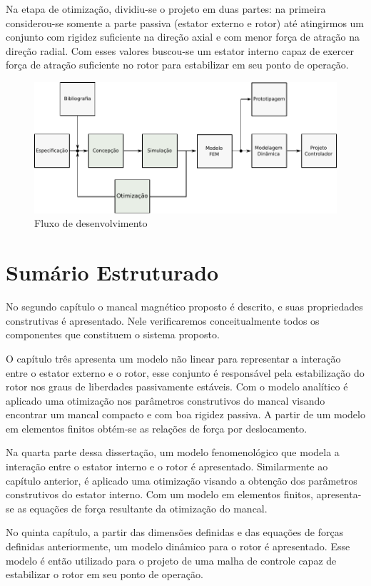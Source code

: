 Na etapa de otimização, dividiu-se o projeto em duas partes: na primeira considerou-se somente a parte passiva (estator externo e rotor) até atingirmos um conjunto com rigidez suficiente na direção axial e com menor força de atração na direção radial. Com esses valores buscou-se um estator interno capaz de exercer força de atração suficiente no rotor para estabilizar em seu ponto de operação.
 
\begin{figure}[th!]
	\centering
	\includegraphics[width=1\linewidth]{Figs/metodologia_fluxo_dev}
	\caption{Fluxo de desenvolvimento}
	\label{fig:metodologia:fluxo:dev}
\end{figure}
 
\section{Sumário Estruturado}
 
No segundo capítulo o mancal magnético proposto é descrito, e suas propriedades construtivas é apresentado. Nele verificaremos conceitualmente todos os componentes que constituem o sistema proposto.

O capítulo três apresenta um modelo não linear para representar a interação entre o estator externo e o rotor, esse conjunto é responsável pela estabilização do rotor nos graus de liberdades passivamente estáveis. Com o modelo analítico é aplicado uma otimização nos parâmetros construtivos do mancal visando encontrar um mancal compacto e com boa rigidez passiva. A partir de um modelo em elementos finitos obtém-se as relações de força por deslocamento.

Na quarta parte dessa dissertação, um modelo fenomenológico que modela a interação entre o estator interno e o rotor é apresentado. Similarmente ao capítulo anterior, é aplicado uma otimização visando a obtenção dos parâmetros construtivos do estator interno. Com um modelo em elementos finitos, apresenta-se as equações de força resultante da otimização do mancal.  

No quinta capítulo, a partir das dimensões definidas e das equações de forças definidas anteriormente, um modelo dinâmico para o rotor é apresentado. Esse modelo é então utilizado para o projeto de uma malha de controle capaz de estabilizar o rotor em seu ponto de operação.



